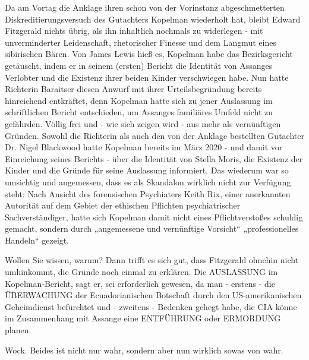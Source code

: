 \begin{multicols}{2}
Da am Vortag die Anklage ihren schon von der Vorinstanz
abgeschmetterten Diskreditierungsversuch des Gutachters Kopelman wiederholt hat, bleibt Edward Fitzgerald
nichts übrig, als ihn inhaltlich nochmals zu widerlegen
- mit unverminderter Leidenschaft, rhetorischer Finesse
und dem Langmut eines sibirischen Bären. Von James
Lewis hieß es, Kopelman habe das Bezirksgericht getäuscht, indem er in seinem (ersten) Bericht die Identität von Assanges Verlobter und die Existenz ihrer beiden
Kinder verschwiegen habe. Nun hatte Richterin Baraitser diesen Anwurf mit ihrer Urteilsbegründung bereits
hinreichend entkräftet, denn Kopelman hatte sich zu jener Auslassung im schriftlichen Bericht entschieden, um
Assanges familiäres Umfeld nicht zu gefährden. Völlig
frei und - wie sich zeigen wird - aus mehr als vernünftigen Gründen. Sowohl die Richterin als auch den von der
Anklage bestellten Gutachter Dr. Nigel Blackwood hatte Kopelman bereits im März 2020 - und damit vor Einreichung seines Berichts - über die Identität von Stella
Moris, die Existenz der Kinder und die Gründe für seine
Auslassung informiert. Das wiederum war so umsichtig
und angemessen, dass es als Skandalon wirklich nicht
zur Verfügung steht: Nach Ansicht des forensischen Psychiaters Keith Rix, einer anerkannten Autorität auf dem
Gebiet der ethischen Pflichten psychiatrischer Sachverständiger, hatte sich Kopelman damit nicht eines
Pflichtverstoßes schuldig gemacht, sondern durch „angemessene und vernünftige Vorsicht“ „professionelles
Handeln“ gezeigt.

Wollen Sie wissen, warum? Dann trifft es sich gut, dass
Fitzgerald ohnehin nicht umhinkommt, die Gründe
noch einmal zu erklären. Die AUSLASSUNG im Kopelman-Bericht, sagt er, sei erforderlich gewesen, da man
- erstens - die ÜBERWACHUNG der Ecuadorianischen
Botschaft durch den US-amerikanischen Geheimdienst
befürchtet und - zweitens - Bedenken gehegt habe, die
CIA könne im Zusammenhang mit Assange eine ENTFÜHRUNG oder ERMORDUNG planen.

Wock. Beides ist nicht nur wahr, sondern aber nun wirklich sowas von wahr.



\end{multicols}
